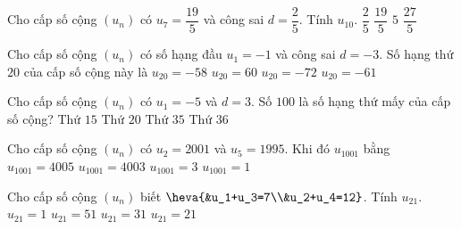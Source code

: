 \begin{ex}%
	Cho cấp số cộng $(u_n)$ có $u_7=\dfrac{19}{5}$ và công sai $d=\dfrac{2}{5}$. Tính $u_{10}$.
	\choice
	{$\dfrac{2}{5}$}
	{$\dfrac{19}{5}$}
	{\True $5$}
	{$\dfrac{27}{5}$}
\end{ex}

\begin{ex}%
	Cho cấp số cộng $(u_n)$ có số hạng đầu $u_1=-1$ và công sai $d=-3$. Số hạng thứ $20$ của cấp số cộng này là
	\choice
	{\True $u_{20}=-58$}
	{$u_{20}=60$}
	{$u_{20}=-72$}
	{$u_{20}=-61$}
\end{ex}

\begin{ex}%
	Cho cấp số cộng $(u_n)$ có $u_1=-5$ và $d=3$. Số $100$ là số hạng thứ mấy của cấp số cộng?
	\choice
	{Thứ $15$}
	{Thứ $20$}
	{Thứ $35$}
	{\True Thứ $36$}
\end{ex}

\begin{ex}%
	Cho cấp số cộng $(u_n)$ có $u_2=2001$ và $u_5=1995$. Khi đó $u_1001$ bằng
	\choice
	{$u_{1001}=4005$}
	{$u_{1001}=4003$}
	{\True $u_{1001}=3$}
	{$u_{1001}=1$}
\end{ex}

\begin{ex}%
	Cho cấp số cộng $(u_n)$ biết $\heva{&u_1+u_3=7\\&u_2+u_4=12}$. Tính $u_{21}$.
	\choice
	{$u_{21}=1$}
	{\True $u_{21}=51$}
	{$u_{21}=31$}
	{$u_{21}=21$}
\end{ex}

